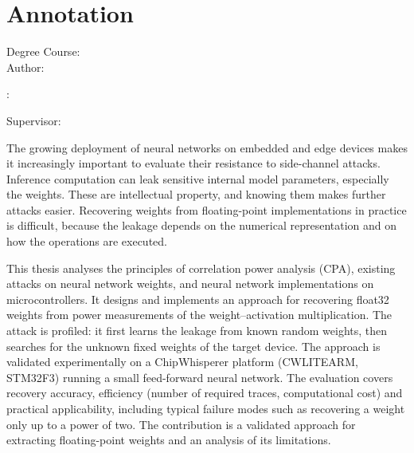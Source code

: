\newpage{}\thispagestyle{empty}\medskip{}

\emptypage

\thispagestyle{empty}

\vspace*{\fill}

\section*{Annotation}

\begin{minipage}[t]{1\columnwidth}
	\FIITuniversity

	\FIITfaculty

	Degree Course: \FIITstudyProgram\\

	Author: \FIITauthor

	\FIITthesis: \FIITtitle

	Supervisor: \FIITsupervisor

	\FIITdate
\end{minipage}

\bigskip{}

The growing deployment of neural networks on embedded and edge devices makes it increasingly important to evaluate their resistance to side-channel attacks. Inference computation can leak sensitive internal model parameters, especially the weights. These are intellectual property, and knowing them makes further attacks easier. Recovering weights from floating-point implementations in practice is difficult, because the leakage depends on the numerical representation and on how the operations are executed.

This thesis analyses the principles of correlation power analysis (CPA), existing attacks on neural network weights, and neural network implementations on microcontrollers. It designs and implements an approach for recovering float32 weights from power measurements of the weight--activation multiplication. The attack is profiled: it first learns the leakage from known random weights, then searches for the unknown fixed weights of the target device. The approach is validated experimentally on a ChipWhisperer platform (CWLITEARM, STM32F3) running a small feed-forward neural network. The evaluation covers recovery accuracy, efficiency (number of required traces, computational cost) and practical applicability, including typical failure modes such as recovering a weight only up to a power of two. The contribution is a validated approach for extracting floating-point weights and an analysis of its limitations.



\newpage{}\thispagestyle{empty}

\emptypage
